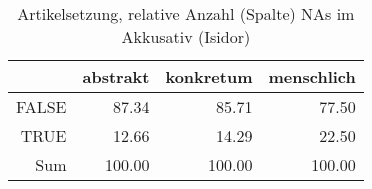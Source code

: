 \begin{table}[ht]
\centering
\begin{tabular}{rrrr}
  \hline
 & abstrakt & konkretum & menschlich \\ 
  \hline
FALSE & 87.34 & 85.71 & 77.50 \\ 
  TRUE & 12.66 & 14.29 & 22.50 \\ 
  Sum & 100.00 & 100.00 & 100.00 \\ 
   \hline
\end{tabular}
\caption{Artikelsetzung, relative Anzahl (Spalte) NAs im Akkusativ (Isidor)} 
\end{table}
